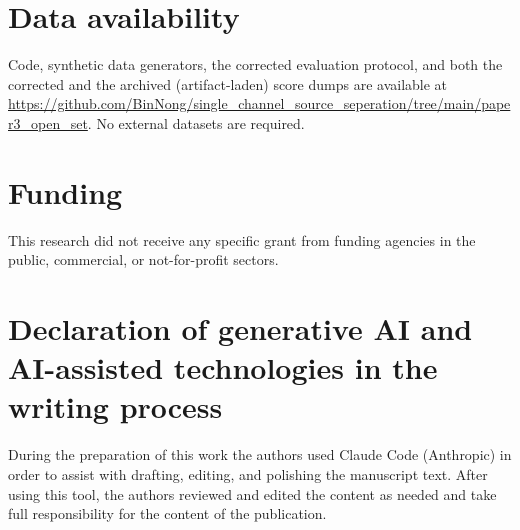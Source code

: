 \documentclass[review,12pt]{elsarticle}
\begin{document}
\section*{Data availability}
Code, synthetic data generators, the corrected evaluation protocol, and
both the corrected and the archived (artifact-laden) score dumps are
available at
\url{https://github.com/BinNong/single_channel_source_seperation/tree/main/paper3_open_set}.
No external datasets are required.

\section*{Funding}
This research did not receive any specific grant from funding agencies
in the public, commercial, or not-for-profit sectors.

\section*{Declaration of generative AI and AI-assisted technologies in the writing process}
During the preparation of this work the authors used Claude Code
(Anthropic) in order to assist with drafting, editing, and polishing the
manuscript text. After using this tool, the authors reviewed and edited
the content as needed and take full responsibility for the content of
the publication.
\end{document}
